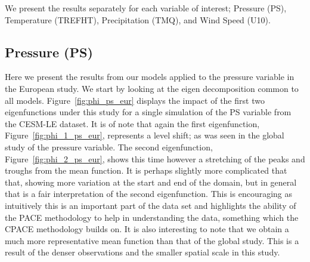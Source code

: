 We present the results separately for each variable of interest; Pressure (PS), Temperature (TREFHT), Precipitation (TMQ), and Wind Speed (U10).

\subsection{Pressure (PS)\label{ssec:cesm_ps_eur}}
Here we present the results from our models applied to the pressure variable in the European study.
We start by looking at the eigen decomposition common to all models.
Figure~\ref{fig:phi_ps_eur} displays the impact of the first two eigenfunctions under this study for a single simulation of the PS variable from the CESM-LE dataset.
It is of note that again the first eigenfunction, Figure~\ref{fig:phi_1_ps_eur}, represents a level shift; as was seen in the global study of the pressure variable.
The second eigenfunction, Figure~\ref{fig:phi_2_ps_eur}, shows this time however a stretching of the peaks and troughs from the mean function.
It is perhaps slightly more complicated that that,  showing more variation at the start and end of the domain, but in general that is a fair interpretation of the second eigenfunction.
This is encouraging as intuitively this is an important part of the data set and highlights the ability of the PACE methodology to help in understanding the data, something which the CPACE methodology builds on.
It is also interesting to note that we obtain a much more representative mean function than that of the global study.
This is a result of the denser observations and the smaller spatial scale in this study.

